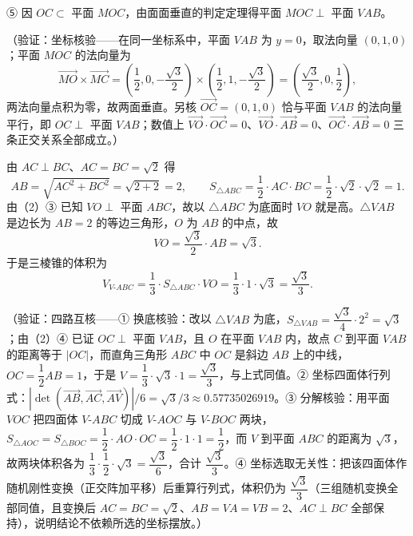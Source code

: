 \begin{answer}
⑤ 因 \(OC\subset\) 平面 \(MOC\)，由面面垂直的判定定理得平面 \(MOC\perp\) 平面 \(VAB\)。

（验证：坐标核验——在同一坐标系中，平面 \(VAB\) 为 \(y=0\)，取法向量 \((0,1,0)\)；平面 \(MOC\) 的法向量为
\nopagebreak[4]
\[
\overrightarrow{MO}\times\overrightarrow{MC}=\left(\frac{1}{2},0,-\frac{\sqrt{3}}{2}\right)\times\left(\frac{1}{2},1,-\frac{\sqrt{3}}{2}\right)=\left(\frac{\sqrt{3}}{2},0,\frac{1}{2}\right),
\]
两法向量点积为零，故两面垂直。另核 \(\overrightarrow{OC}=(0,1,0)\) 恰与平面 \(VAB\) 的法向量平行，即 \(OC\perp\) 平面 \(VAB\)；数值上 \(\overrightarrow{VO}\cdot\overrightarrow{OC}=0\)、\(\overrightarrow{VO}\cdot\overrightarrow{AB}=0\)、\(\overrightarrow{OC}\cdot\overrightarrow{AB}=0\) 三条正交关系全部成立。）


由 \(AC\perp BC\)、\(AC=BC=\sqrt{2}\) 得
\nopagebreak[4]
\[
AB=\sqrt{AC^{2}+BC^{2}}=\sqrt{2+2}=2,\qquad S_{\triangle ABC}=\frac{1}{2}\cdot AC\cdot BC=\frac{1}{2}\cdot\sqrt{2}\cdot\sqrt{2}=1 .
\]
由（2）③ 已知 \(VO\perp\) 平面 \(ABC\)，故以 \(\triangle ABC\) 为底面时 \(VO\) 就是高。\(\triangle VAB\) 是边长为 \(AB=2\) 的等边三角形，\(O\) 为 \(AB\) 的中点，故
\nopagebreak[4]
\[
VO=\frac{\sqrt{3}}{2}\cdot AB=\sqrt{3} .
\]
于是三棱锥的体积为
\nopagebreak[4]
\[
V_{V\text{-}ABC}=\frac{1}{3}\cdot S_{\triangle ABC}\cdot VO=\frac{1}{3}\cdot1\cdot\sqrt{3}=\frac{\sqrt{3}}{3}.
\]

（验证：四路互核——① 换底核验：改以 \(\triangle VAB\) 为底，\(S_{\triangle VAB}=\dfrac{\sqrt{3}}{4}\cdot2^{2}=\sqrt{3}\)；由（2）④ 已证 \(OC\perp\) 平面 \(VAB\)，且 \(O\) 在平面 \(VAB\) 内，故点 \(C\) 到平面 \(VAB\) 的距离等于 \(|OC|\)，而直角三角形 \(ABC\) 中 \(OC\) 是斜边 \(AB\) 上的中线，\(OC=\dfrac{1}{2}AB=1\)，于是 \(V=\dfrac{1}{3}\cdot\sqrt{3}\cdot1=\dfrac{\sqrt{3}}{3}\)，与上式同值。② 坐标四面体行列式：\(\left|\det\left(\overrightarrow{AB},\overrightarrow{AC},\overrightarrow{AV}\right)\right|/6=\sqrt{3}/3\approx0.57735026919\)。③ 分解核验：用平面 \(VOC\) 把四面体 \(V\text{-}ABC\) 切成 \(V\text{-}AOC\) 与 \(V\text{-}BOC\) 两块，\(S_{\triangle AOC}=S_{\triangle BOC}=\dfrac{1}{2}\cdot AO\cdot OC=\dfrac{1}{2}\cdot1\cdot1=\dfrac{1}{2}\)，而 \(V\) 到平面 \(ABC\) 的距离为 \(\sqrt{3}\)，故两块体积各为 \(\dfrac{1}{3}\cdot\dfrac{1}{2}\cdot\sqrt{3}=\dfrac{\sqrt{3}}{6}\)，合计 \(\dfrac{\sqrt{3}}{3}\)。④ 坐标选取无关性：把该四面体作随机刚性变换（正交阵加平移）后重算行列式，体积仍为 \(\dfrac{\sqrt{3}}{3}\)（三组随机变换全部同值，且变换后 \(AC=BC=\sqrt{2}\)、\(AB=VA=VB=2\)、\(AC\perp BC\) 全部保持），说明结论不依赖所选的坐标摆放。）




\end{answer}
